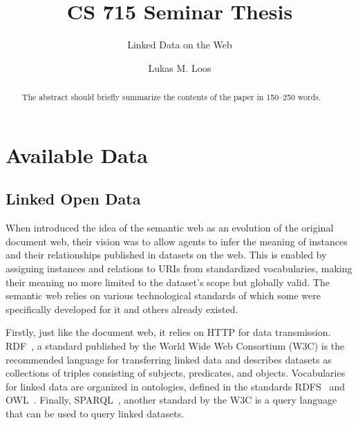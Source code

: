 \documentclass[runningheads]{llncs}
\begin{document}
%
    \title{CS 715 Seminar Thesis}
    \subtitle{Linked Data on the Web}
%
%
    \author{Lukas M. Loos}
%
%
%
    \maketitle              %
%
    \begin{abstract}
        The abstract should briefly summarize the contents of the paper in
        150--250 words.

    \end{abstract}


    \section{Available Data}

    \subsection{Linked Open Data}
    When \citet{berners2001semantic} introduced the idea of the semantic web as an evolution of the original document web, their vision was to allow agents to infer the meaning of instances and their relationships published in datasets on the web.
    This is enabled by assigning instances and relations to URIs from standardized vocabularies, making their meaning no more limited to the dataset's scope but globally valid.
    The semantic web relies on various technological standards of which some were specifically developed for it and others already existed.

    Firstly, just like the document web, it relies on HTTP for data transmission.
    RDF~\citep{RDF}, a standard published by the World Wide Web Consortium (W3C) is the recommended language for transferring linked data and describes datasets as collections of triples consisting of subjects, predicates, and objects.
    Vocabularies for linked data are organized in ontologies, defined in the standards RDFS~\citep{RDFS} and OWL~\citep{OWL}.
    Finally, SPARQL~\citep{SPARQL}, another standard by the W3C is a query language that can be used to query linked datasets.
\end{document}
